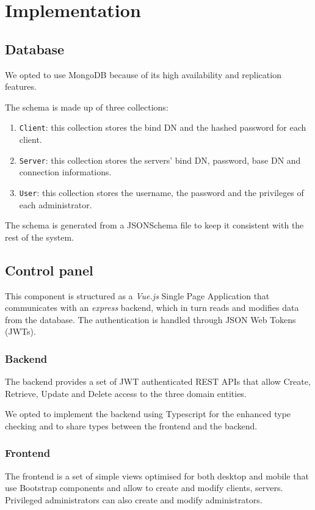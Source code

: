 \documentclass{scrartcl}
\begin{document}
\section{Implementation}

\subsection{Database}
\par We opted to use MongoDB because of its high availability and replication features.
\par The schema is made up of three collections:
\begin{enumerate}
    \item \texttt{Client}: this collection stores the bind DN and the hashed password for each client.
    \item \texttt{Server}: this collection stores the servers' bind DN, password, base DN and connection informations.
    \item \texttt{User}: this collection stores the username, the password and the privileges of each administrator.
\end{enumerate}
\par The schema is generated from a JSONSchema file to keep it consistent with the rest of the system.

\subsection{Control panel}

\par This component is structured as a \textit{Vue.js} Single Page Application that communicates with an \textit{express} backend, which in turn reads and modifies data from the database. The authentication is handled through JSON Web Tokens (JWTs).
\subsubsection{Backend}
\par The backend provides a set of JWT authenticated REST APIs that allow Create, Retrieve, Update and Delete access to the three domain entities.
\par We opted to implement the backend using Typescript for the enhanced type checking and to share types between the frontend and the backend.
\subsubsection{Frontend}
\par The frontend is a set of simple views optimised for both desktop and mobile that use Bootstrap components and allow to create and modify clients, servers. Privileged administrators can also create and modify administrators.
\end{document}
